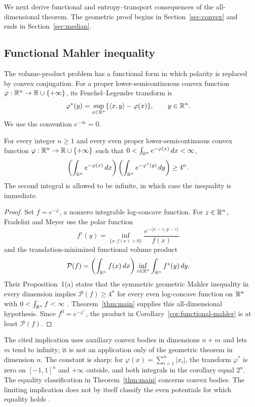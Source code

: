 We next derive functional and entropy--transport consequences of the
all-dimensional theorem. The geometric proof begins in
Section~\ref{sec:convex} and ends in Section~\ref{sec:median}.

\subsection{Functional Mahler inequality}\label{sec:functional-mahler}

The volume-product problem has a functional form in which polarity is
replaced by convex conjugation. For a proper lower-semicontinuous convex
function $\varphi:\mathbb R^n\to\mathbb R\cup\{+\infty\}$, its Fenchel--Legendre transform is
\[
 \varphi^*(y)=\sup_{x\in\mathbb R^n}\{\langle x,y\rangle-\varphi(x)\},
 \qquad y\in\mathbb R^n.
\]
We use the convention $e^{-\infty}=0$.

\begin{corollary}\label{cor:functional-mahler}
For every integer $n\ge1$ and every even proper lower-semicontinuous
convex function $\varphi:\mathbb R^n\to\mathbb R\cup\{+\infty\}$ such that
$0<\int_{\mathbb R^n}e^{-\varphi(x)}\,dx<\infty$,
\[
 \left(\int_{\mathbb R^n}e^{-\varphi(x)}\,dx\right)
 \left(\int_{\mathbb R^n}e^{-\varphi^*(y)}\,dy\right)\ge4^n.
\]
The second integral is allowed to be infinite, in which case the
inequality is immediate.
\end{corollary}

\begin{proof}
Set $f=e^{-\varphi}$, a nonzero integrable log-concave function. For
$z\in\mathbb R^n$, Fradelizi and Meyer use the polar function
\[
 f^z(y)=\inf_{\{x:f(x)>0\}}
        \frac{e^{-\langle x-z,y-z\rangle}}{f(x)}
\]
and the translation-minimized functional volume product
\[
 \mathcal P(f)=
 \left(\int_{\mathbb R^n}f(x)\,dx\right)
 \inf_{z\in\mathbb R^n}\int_{\mathbb R^n}f^z(y)\,dy.
\]
Their Proposition~1(a) states that the symmetric geometric Mahler
inequality in every dimension implies $\mathcal P(f)\ge4^n$ for every
even log-concave function on $\mathbb R^n$ with $0<\int_{\mathbb R^n}f<\infty$
\cite{FradeliziMeyer2008}. Theorem~\ref{thm:main} supplies this
all-dimensional hypothesis. Since $f^0=e^{-\varphi^*}$, the product
in Corollary~\ref{cor:functional-mahler} is at least $\mathcal P(f)$.
\end{proof}

The cited implication uses auxiliary convex bodies in dimensions
$n+m$ and lets $m$ tend to infinity; it is not an application only of
the geometric theorem in dimension $n$. The constant is sharp:
for $\varphi(x)=\sum_{i=1}^n|x_i|$, the transform $\varphi^*$ is zero on
$[-1,1]^n$ and $+\infty$ outside, and both integrals in
the corollary equal $2^n$. The equality classification
in Theorem~\ref{thm:main} concerns convex bodies. The limiting
implication does not by itself classify the even potentials for which
equality holds \cite[p.~1437]{FradeliziMeyer2008}.

